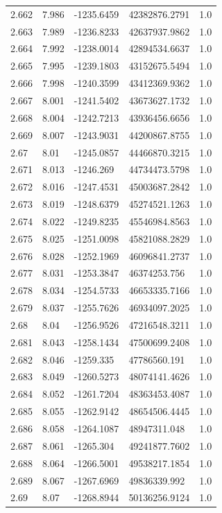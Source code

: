 \begin{tabular}{lllll}
2.662 & 7.986 & -1235.6459 & 42382876.2791 & 1.0 \\
2.663 & 7.989 & -1236.8233 & 42637937.9862 & 1.0 \\
2.664 & 7.992 & -1238.0014 & 42894534.6637 & 1.0 \\
2.665 & 7.995 & -1239.1803 & 43152675.5494 & 1.0 \\
2.666 & 7.998 & -1240.3599 & 43412369.9362 & 1.0 \\
2.667 & 8.001 & -1241.5402 & 43673627.1732 & 1.0 \\
2.668 & 8.004 & -1242.7213 & 43936456.6656 & 1.0 \\
2.669 & 8.007 & -1243.9031 & 44200867.8755 & 1.0 \\
2.67 & 8.01 & -1245.0857 & 44466870.3215 & 1.0 \\
2.671 & 8.013 & -1246.269 & 44734473.5798 & 1.0 \\
2.672 & 8.016 & -1247.4531 & 45003687.2842 & 1.0 \\
2.673 & 8.019 & -1248.6379 & 45274521.1263 & 1.0 \\
2.674 & 8.022 & -1249.8235 & 45546984.8563 & 1.0 \\
2.675 & 8.025 & -1251.0098 & 45821088.2829 & 1.0 \\
2.676 & 8.028 & -1252.1969 & 46096841.2737 & 1.0 \\
2.677 & 8.031 & -1253.3847 & 46374253.756 & 1.0 \\
2.678 & 8.034 & -1254.5733 & 46653335.7166 & 1.0 \\
2.679 & 8.037 & -1255.7626 & 46934097.2025 & 1.0 \\
2.68 & 8.04 & -1256.9526 & 47216548.3211 & 1.0 \\
2.681 & 8.043 & -1258.1434 & 47500699.2408 & 1.0 \\
2.682 & 8.046 & -1259.335 & 47786560.191 & 1.0 \\
2.683 & 8.049 & -1260.5273 & 48074141.4626 & 1.0 \\
2.684 & 8.052 & -1261.7204 & 48363453.4087 & 1.0 \\
2.685 & 8.055 & -1262.9142 & 48654506.4445 & 1.0 \\
2.686 & 8.058 & -1264.1087 & 48947311.048 & 1.0 \\
2.687 & 8.061 & -1265.304 & 49241877.7602 & 1.0 \\
2.688 & 8.064 & -1266.5001 & 49538217.1854 & 1.0 \\
2.689 & 8.067 & -1267.6969 & 49836339.992 & 1.0 \\
2.69 & 8.07 & -1268.8944 & 50136256.9124 & 1.0 \\

\end{tabular}
